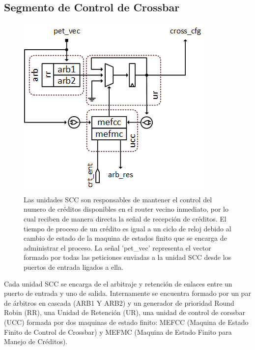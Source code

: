 \subsection{Segmento de Control de Crossbar}
	\label{scc}

\begin{figure}
	\begin{center}
		\includegraphics[scale=0.9]{figures/ch4_unidad_scc.png}
	\end{center}
	\caption
		{	
			Las unidades SCC son responsables de mantener el control del numero de créditos disponibles  en el router vecino inmediato, por lo cual reciben de manera directa la señal de recepción de créditos. El tiempo de proceso de un crédito es igual a un ciclo de reloj debido al cambio de estado de la maquina de estados finito que se encarga de administrar el proceso. La señal 'pet\_vec' representa el vector formado por todas las peticiones enviadas a la unidad SCC desde los puertos de entrada ligados a ella.
		}
	\label{fig:ch4_unidad_scc}
\end{figure}

Cada unidad SCC se encarga de el arbitraje y retención de enlaces entre un puerto de entrada y uno de salida. Internamente se encuentra formado por un par de árbitros en cascada (ARB1 Y ARB2) y un generador de prioridad Round Robin (RR), una Unidad de Retención (UR), una unidad de control de corssbar (UCC) formada por dos maquinas de estado finito: MEFCC (Maquina de Estado Finito de Control de Crossbar) y MEFMC (Maquina de Estado Finito para Manejo de Créditos).


